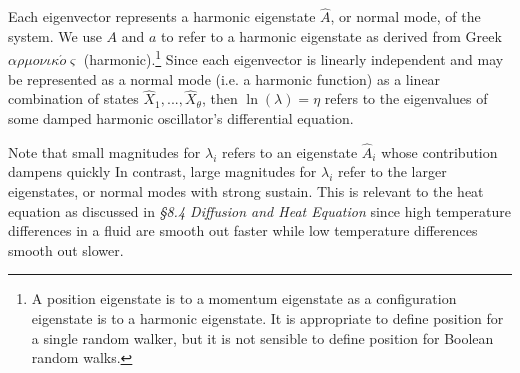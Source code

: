 \documentclass[10pt, a5paper, twoside, openright]{memoir}
\begin{document}
Each eigenvector represents a harmonic eigenstate $\hat A$, or normal mode, of the system. We use $A$ and $a$ to refer to a harmonic eigenstate as derived from Greek $\alpha \rho \mu o \nu \iota \kappa \acute o \varsigma$ (harmonic).\footnote{A position eigenstate is to a momentum eigenstate as a configuration eigenstate is to a harmonic eigenstate. It is appropriate to define position for a single random walker, but it is not sensible to define position for Boolean random walks.} Since each eigenvector is linearly independent and may be represented as a normal mode (i.e. a harmonic function) as a linear combination of states $\hat X_1,...,\hat X_\theta$, then $\ln(\lambda) = \eta$ refers to the eigenvalues of some damped harmonic oscillator's differential equation.

Note that small magnitudes for $\lambda_i$ refers to an eigenstate $\hat A_i$ whose contribution dampens quickly In contrast, large magnitudes for $\lambda_i$ refer to the larger eigenstates, or normal modes with strong sustain. This is relevant to the heat equation as discussed in \textit{\S 8.4 Diffusion and Heat Equation} since high temperature differences in a fluid are smooth out faster while low temperature differences smooth out slower. 
\end{document}

